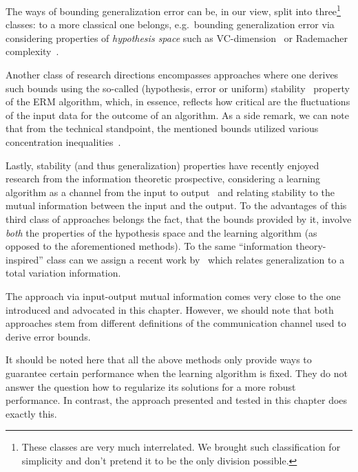 The ways of bounding generalization error  can be, in our view, split into
three\footnote{These classes are very much interrelated. We brought such
classification for simplicity and don't pretend it to be the only division
possible.} classes: to a more classical one belongs, e.g.~bounding
generalization error via considering properties of \textit{hypothesis space}
such as VC-dimension~\citep{Vapnik71,Vapnik:1982} or Rademacher
complexity~\citep{Shalev-Shwartz:2014}.

Another class of research directions encompasses approaches where one derives
such bounds using the so-called (hypothesis, error or uniform)
stability~\citep{Devroye79,Bousquet:2002} property of the ERM algorithm, which,
in essence, reflects how critical are the fluctuations of the input data for the
outcome of an algorithm. As a side remark, we can note that from the technical
standpoint, the mentioned bounds utilized various concentration
inequalities~\citep{RaginskyS15}. 

Lastly, stability  (and thus generalization) properties have recently enjoyed
research from the information theoretic prospective, considering a learning
algorithm as a channel from the input to output~\citep{Russo15,Xu17} and
relating stability to the mutual information between the input and the output.
To the advantages of this third class of approaches belongs the fact, that the
bounds provided by it, involve \textit{both} the properties of the hypothesis
space and the learning algorithm (as opposed to the aforementioned methods). To
the same ``information theory-inspired'' class can we assign a recent work
by~\citet{Alabdulmohsin:2015} which relates generalization to a total variation
 information.

\myremark The approach via input-output mutual information comes very close to
the one introduced and advocated in this chapter. However, we should note that
both approaches stem from different definitions of the communication channel
used to derive error bounds.

\myremark It should be noted here that all the above methods only provide ways 
to guarantee certain performance when the learning algorithm is fixed. They do
not answer the question how to regularize its solutions for a more robust
performance. In contrast, the approach presented and tested in this chapter does
exactly this.

